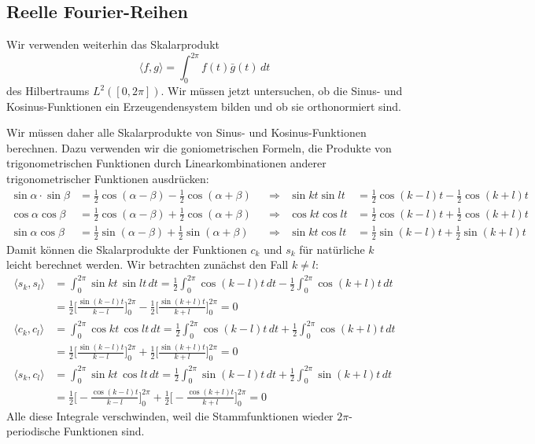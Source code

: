 \subsection{Reelle Fourier-Reihen}
\label{subsection:real-fourier-series}
Wir verwenden weiterhin das Skalarprodukt
\[
\langle f,g\rangle
=
\int_0^{2\pi} f(t) \bar{g}(t)\,dt
\]
des Hilbertraums $L^2([0,2\pi])$.
Wir müssen jetzt untersuchen, ob die Sinus- und Kosinus-Funktionen
ein Erzeugendensystem bilden und ob sie orthonormiert sind.

Wir müssen daher alle Skalarprodukte von Sinus- und Kosinus-Funktionen
berechnen.
%
Dazu verwenden wir die goniometrischen Formeln, die Produkte von
trigonometrischen Funktionen durch Linearkombinationen anderer
trigonometrischer Funktionen ausdrücken:
\begin{align*}
\sin\alpha\cdot \sin\beta
&=
\frac12 \cos(\alpha-\beta) - \frac12\cos(\alpha+\beta)
&&\Rightarrow&
\sin kt \sin lt
&=
\frac12 \cos(k-l)t - \frac12\cos(k+l)t
\\
\cos\alpha \cos\beta
&=
\frac12\cos(\alpha-\beta) +\frac12\cos(\alpha+\beta)
&&\Rightarrow&
\cos kt \cos lt
&=
\frac12\cos(k-l)t + \frac12\cos(k+l)t
\\
\sin\alpha\cos\beta
&=
\frac12\sin(\alpha-\beta) + \frac12\sin(\alpha+\beta)
&&\Rightarrow&
\sin kt\cos lt
&=
\frac12\sin(k-l)t + \frac12\sin(k+l)t
\end{align*}
Damit können die Skalarprodukte der Funktionen $c_k$ und $s_k$ für natürliche
$k$ leicht berechnet werden.
Wir betrachten zunächst den Fall $k\ne l$:
\begin{align*}
\langle s_k, s_l\rangle
&=
\int_0^{2\pi} \sin kt\, \sin lt \,dt
=
\frac12\int_0^{2\pi} \cos(k-l)t\,dt
-
\frac12\int_0^{2\pi} \cos(k+l)t\,dt
\\
&=
\frac12\biggl[ \frac{\sin(k-l)t}{k-l} \biggr]_0^{2\pi}
-
\frac12\biggl[ \frac{\sin(k+l)t}{k+l} \biggr]_0^{2\pi}
=
0
\\
\langle c_k, c_l\rangle
&=
\int_0^{2\pi} \cos kt\, \cos lt \,dt
=
\frac12\int_0^{2\pi}\cos(k-l)t\,dt
+
\frac12\int_0^{2\pi}\cos(k+l)t\,dt
\\
&=
\frac12\biggl[ \frac{\sin (k-l)t}{k-l}\biggr]_0^{2\pi}
+
\frac12\biggl[ \frac{\sin (k+l)t}{k+l}\biggr]_0^{2\pi}
=
0
\\
\langle s_k, c_l\rangle
&=
\int_0^{2\pi} \sin kt\, \cos lt \,dt
=
\frac12\int_0^{2\pi} \sin(k-l)t\,dt
+
\frac12\int_0^{2\pi} \sin(k+l)t\,dt
\\
&=
\frac12\biggl[-\frac{\cos(k-l)t}{k-l}\biggr]_0^{2\pi}
+
\frac12\biggl[-\frac{\cos(k+l)t}{k+l}\biggr]_0^{2\pi}
=
0
\end{align*}
Alle diese Integrale verschwinden, weil die Stammfunktionen wieder
$2\pi$-periodische Funktionen sind.

